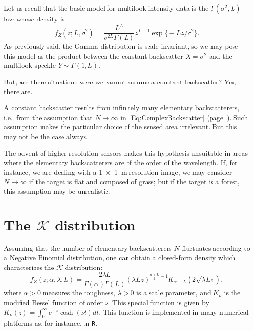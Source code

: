 \documentclass{beamer}
\begin{document}
\begin{frame}[allowframebreaks]
Let us recall that the basic model for multilook intensity data is the $\Gamma(\sigma^2,L)$ law whose density is
\begin{equation}
f_Z(z;L,\sigma^2) = \frac{L^L}{\sigma^{2L}\Gamma(L)} z^{L-1} 
	\exp\big\{ -L z / \sigma^2
	\big\}.
\end{equation}
As previously said, the Gamma distribution is scale-invariant, so we may pose this model as the product between the constant backscatter $X=\sigma^2$ and the multilook speckle $Y\sim\Gamma(1,L)$.

But, are there situations were we cannot assume a constant backscatter?
Yes, there are.
\end{frame}


\begin{frame}[allowframebreaks]
A constant backscatter results from infinitely many elementary backscatterers, i.e.\ from the assumption that $N\to\infty$ in~\eqref{Eq:ComplexBackscatter} (page~\pageref{Eq:ComplexBackscatter}).
Such assumption makes the particular choice of the sensed area irrelevant.
But this may not be the case always.

The advent of higher resolution sensors makes this hypothesis unsuitable in areas where the elementary backscatterers are of the order of the wavelength.
If, for instance, we are dealing with a \SI{1x1}{\meter} resolution image, we may consider $N\to\infty$ if the target is flat and composed of grass;
but if the target is a forest, this assumption may be unrealistic.

\end{frame}

\section{The $\mathcal K$ distribution}

\begin{frame}[allowframebreaks]

Assuming that the number of elementary backscatterers $N$ fluctuates according to a Negative Binomial distribution, one can obtain a closed-form density which characterizes the $\mathcal K$ distribution:
\begin{equation}
f_Z(z;\alpha,\lambda,L) =
\frac{2\lambda L}{\Gamma(\alpha)\Gamma(L)} (\lambda L z)^{\frac{\alpha+L}{2}-1} K_{\alpha-L}(2\sqrt{\lambda L z}),
\label{Eq:DensKI}
\end{equation}
where $\alpha>0$ measures the roughness, $\lambda>0$ is a scale parameter, and $K_\nu$ is the modified Bessel function of order $\nu$.
This special function is given by $K_\nu (z) = \int_0^\infty e^{-z} \cosh (\nu t) dt$.
This function is implemented in many numerical platforms as, for instance, in \texttt R.
\end{frame}
\end{document}
